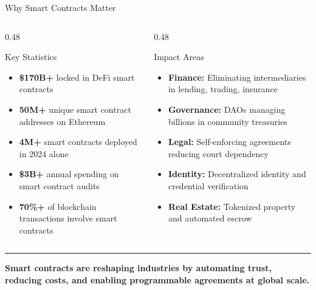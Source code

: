 \documentclass[8pt,aspectratio=169]{beamer}
\newcommand{\bottomnote}[1]{%
\vfill
\vspace{-2mm}
\textcolor{mllavender2}{\rule{\textwidth}{0.4pt}}
\vspace{1mm}
\footnotesize
\textbf{#1}
}
\begin{document}
\begin{frame}{Why Smart Contracts Matter}
\begin{columns}[T]
\begin{column}{0.48\textwidth}
\vspace{2mm}
\begin{block}{Key Statistics}
\begin{itemize}\setlength\itemsep{5pt}
  \item[\small$\checkmark$] \small \textbf{\$170B+} locked in DeFi smart contracts
  \item[\small$\checkmark$] \small \textbf{50M+} unique smart contract addresses on Ethereum
  \item[\small$\checkmark$] \small \textbf{4M+} smart contracts deployed in 2024 alone
  \item[\small$\checkmark$] \small \textbf{\$3B+} annual spending on smart contract audits
  \item[\small$\checkmark$] \small \textbf{70\%+} of blockchain transactions involve smart contracts
\end{itemize}
\end{block}
\end{column}
\begin{column}{0.48\textwidth}
\vspace{2mm}
\begin{block}{Impact Areas}
\begin{itemize}\setlength\itemsep{5pt}
  \item[\small$\checkmark$] \small \textbf{Finance:} Eliminating intermediaries in lending, trading, insurance
  \item[\small$\checkmark$] \small \textbf{Governance:} DAOs managing billions in community treasuries
  \item[\small$\checkmark$] \small \textbf{Legal:} Self-enforcing agreements reducing court dependency
  \item[\small$\checkmark$] \small \textbf{Identity:} Decentralized identity and credential verification
  \item[\small$\checkmark$] \small \textbf{Real Estate:} Tokenized property and automated escrow
\end{itemize}
\end{block}
\end{column}
\end{columns}
\bottomnote{Smart contracts are reshaping industries by automating trust, reducing costs, and enabling programmable agreements at global scale.}
\end{frame}
\end{document}
